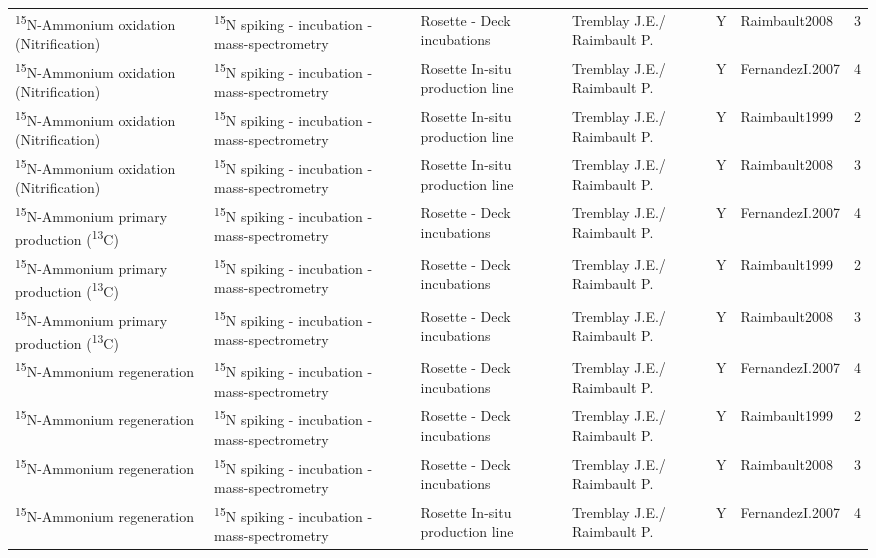 \begin{ThreePartTable}
\begin{longtable}[t]{lllllll}
\textsuperscript{15}N-Ammonium oxidation (Nitrification) & \textsuperscript{15}N spiking - incubation - mass-spectrometry & Rosette - Deck incubations & Tremblay J.E./ Raimbault P. & Y & Raimbault2008 & 3\\
\textsuperscript{15}N-Ammonium oxidation (Nitrification) & \textsuperscript{15}N spiking - incubation - mass-spectrometry & Rosette In-situ production line & Tremblay J.E./ Raimbault P. & Y & FernandezI.2007 & 4\\
\textsuperscript{15}N-Ammonium oxidation (Nitrification) & \textsuperscript{15}N spiking - incubation - mass-spectrometry & Rosette In-situ production line & Tremblay J.E./ Raimbault P. & Y & Raimbault1999 & 2\\
\addlinespace
\textsuperscript{15}N-Ammonium oxidation (Nitrification) & \textsuperscript{15}N spiking - incubation - mass-spectrometry & Rosette In-situ production line & Tremblay J.E./ Raimbault P. & Y & Raimbault2008 & 3\\
\textsuperscript{15}N-Ammonium primary production (\textsuperscript{13}C) & \textsuperscript{15}N spiking - incubation - mass-spectrometry & Rosette - Deck incubations & Tremblay J.E./ Raimbault P. & Y & FernandezI.2007 & 4\\
\textsuperscript{15}N-Ammonium primary production (\textsuperscript{13}C) & \textsuperscript{15}N spiking - incubation - mass-spectrometry & Rosette - Deck incubations & Tremblay J.E./ Raimbault P. & Y & Raimbault1999 & 2\\
\textsuperscript{15}N-Ammonium primary production (\textsuperscript{13}C) & \textsuperscript{15}N spiking - incubation - mass-spectrometry & Rosette - Deck incubations & Tremblay J.E./ Raimbault P. & Y & Raimbault2008 & 3\\
\textsuperscript{15}N-Ammonium regeneration & \textsuperscript{15}N spiking - incubation - mass-spectrometry & Rosette - Deck incubations & Tremblay J.E./ Raimbault P. & Y & FernandezI.2007 & 4\\
\addlinespace
\textsuperscript{15}N-Ammonium regeneration & \textsuperscript{15}N spiking - incubation - mass-spectrometry & Rosette - Deck incubations & Tremblay J.E./ Raimbault P. & Y & Raimbault1999 & 2\\
\textsuperscript{15}N-Ammonium regeneration & \textsuperscript{15}N spiking - incubation - mass-spectrometry & Rosette - Deck incubations & Tremblay J.E./ Raimbault P. & Y & Raimbault2008 & 3\\
\textsuperscript{15}N-Ammonium regeneration & \textsuperscript{15}N spiking - incubation - mass-spectrometry & Rosette In-situ production line & Tremblay J.E./ Raimbault P. & Y & FernandezI.2007 & 4\\

\end{longtable}
\end{ThreePartTable}
